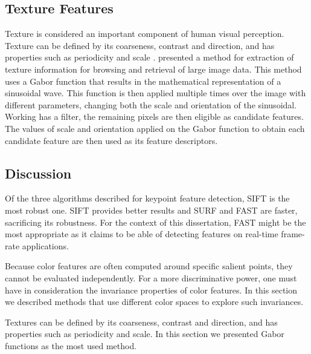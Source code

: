 \subsection{Texture Features}

Texture is considered an important component of human visual perception. Texture can be defined by its coarseness, contrast and direction, and has properties such as periodicity and scale \cite{howarth2004evaluation}.
\citeauthor{manjunath1996texture} \cite{manjunath1996texture} presented a method for extraction of texture information for browsing and retrieval of large image data. This method uses a Gabor function that results in the mathematical representation of a sinusoidal wave. This function is then applied multiple times over the image with different parameters, changing both the scale and orientation of the sinusoidal. Working has a filter, the remaining pixels are then eligible as candidate features. The values of scale and orientation applied on the Gabor function to obtain each candidate feature are then used as its feature descriptors.

\subsection{Discussion}

Of the three algorithms described for keypoint feature detection, SIFT is the most robust one. SIFT provides better results and SURF and FAST are faster, sacrificing its robustness. For the context of this dissertation, FAST might be the most appropriate as it claims to be able of detecting features on real-time frame-rate applications.

Because color features are often computed around specific salient points, they cannot be evaluated independently. For a more discriminative power, one must have in consideration the invariance properties of color features. In this section we described methods that use different color spaces to explore such invariances.

Textures can be defined by its coarseness, contrast and direction, and has properties such as periodicity and scale. In this section we presented Gabor functions as the most used method.